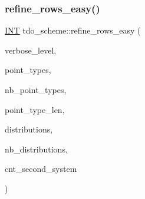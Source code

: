 \mbox{\label{classtdo__scheme_a4eb0c42c823a3543624cbca3a790d055}} 
\subsubsection{\texorpdfstring{refine\+\_\+rows\+\_\+easy()}{refine\_rows\_easy()}}
{\footnotesize\ttfamily \mbox{\hyperlink{galois_8h_a09fddde158a3a20bd2dcadb609de11dc}{I\+NT}} tdo\+\_\+scheme\+::refine\+\_\+rows\+\_\+easy (\begin{DoxyParamCaption}\item[{int}]{verbose\+\_\+level,  }\item[{\mbox{\hyperlink{galois_8h_a09fddde158a3a20bd2dcadb609de11dc}{I\+NT}} $\ast$\&}]{point\+\_\+types,  }\item[{\mbox{\hyperlink{galois_8h_a09fddde158a3a20bd2dcadb609de11dc}{I\+NT}} \&}]{nb\+\_\+point\+\_\+types,  }\item[{\mbox{\hyperlink{galois_8h_a09fddde158a3a20bd2dcadb609de11dc}{I\+NT}} \&}]{point\+\_\+type\+\_\+len,  }\item[{\mbox{\hyperlink{galois_8h_a09fddde158a3a20bd2dcadb609de11dc}{I\+NT}} $\ast$\&}]{distributions,  }\item[{\mbox{\hyperlink{galois_8h_a09fddde158a3a20bd2dcadb609de11dc}{I\+NT}} \&}]{nb\+\_\+distributions,  }\item[{\mbox{\hyperlink{galois_8h_a09fddde158a3a20bd2dcadb609de11dc}{I\+NT}} \&}]{cnt\+\_\+second\+\_\+system }\end{DoxyParamCaption})}

\mbox{\label{classtdo__scheme_ad31c51c06f5d669f6d22bac350531e69}} 
